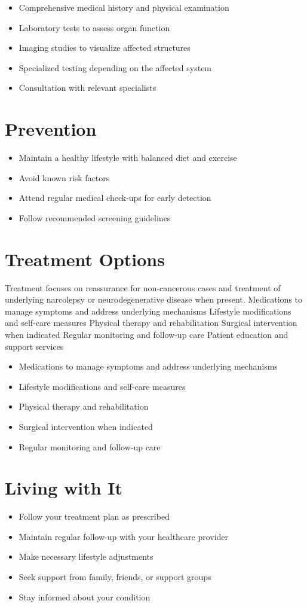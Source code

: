 \begin{itemize}[noitemsep]
  \item Comprehensive medical history and physical examination
  \item Laboratory tests to assess organ function
  \item Imaging studies to visualize affected structures
  \item Specialized testing depending on the affected system
  \item Consultation with relevant specialists
\end{itemize}
\section{Prevention}
\begin{itemize}[noitemsep]
  \item Maintain a healthy lifestyle with balanced diet and exercise
  \item Avoid known risk factors
  \item Attend regular medical check-ups for early detection
  \item Follow recommended screening guidelines
\end{itemize}
\section{Treatment Options}
Treatment focuses on reassurance for non-cancerous cases and treatment of underlying narcolepsy or neurodegenerative disease when present. Medications to manage symptoms and address underlying mechanisms Lifestyle modifications and self-care measures Physical therapy and rehabilitation Surgical intervention when indicated Regular monitoring and follow-up care Patient education and support services

\begin{itemize}[noitemsep]
  \item Medications to manage symptoms and address underlying mechanisms
  \item Lifestyle modifications and self-care measures
  \item Physical therapy and rehabilitation
  \item Surgical intervention when indicated
  \item Regular monitoring and follow-up care
\end{itemize}
\section{Living with It}
\begin{itemize}[noitemsep]
  \item Follow your treatment plan as prescribed
  \item Maintain regular follow-up with your healthcare provider
  \item Make necessary lifestyle adjustments
  \item Seek support from family, friends, or support groups
  \item Stay informed about your condition
\end{itemize}
